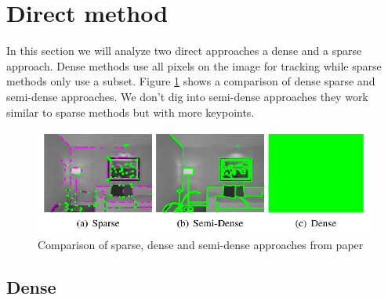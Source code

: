 \documentclass[11pt,a4paper,titlepage,oneside]{report}
\begin{document}
\section{Direct method}

In this section we will analyze two direct approaches a dense and a sparse approach. Dense methods use all pixels on the image for tracking while sparse methods only use a subset. Figure \ref{fig:sparse_dense} shows a comparison of dense sparse and semi-dense approaches. We don't dig into semi-dense approaches they work similar to sparse methods but with more keypoints.

\begin{figure}[H]
  \begin{center}
		\includegraphics[width=1.0\textwidth]{img/sparse_dense.png}
  \end{center}
	\caption{Comparison of sparse, dense and semi-dense approaches from paper \cite{svo}}\label{fig:sparse_dense}
\end{figure}

\subsection{Dense}
\end{document}
